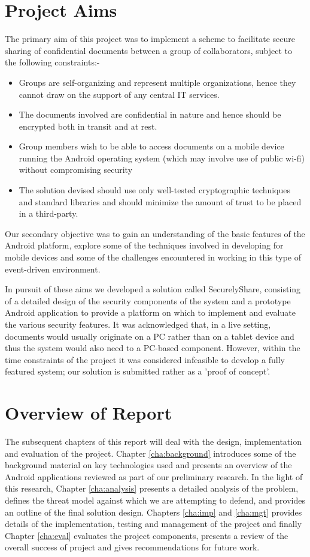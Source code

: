 \section{Project Aims}
\label{sec:aims}
The primary aim of this project was to implement a scheme to facilitate secure sharing of confidential documents between a group of collaborators, subject to the following constraints:-
\begin{itemize}
\item Groups are self-organizing and represent multiple organizations, hence they cannot draw on the support of any central IT services.
\item The documents involved are confidential in nature and hence should be encrypted both in transit and at rest.
\item Group members wish to be able to access documents on a mobile device running the Android operating system (which may involve use of public wi-fi) without compromising security 
\item The solution devised should use only well-tested cryptographic techniques and standard libraries and should minimize the amount of trust to be placed in a third-party.
\end{itemize}

Our secondary objective was to gain an understanding of the basic features of the Android platform, explore some of the techniques involved in developing  for mobile devices and some of the challenges encountered in working in this type of event-driven environment.

In pursuit of these aims we developed a solution called SecurelyShare, consisting of a detailed design of the security components of the system and a prototype Android application to provide a platform on which to implement and evaluate the various security features.  It was acknowledged that, in a live setting, documents would usually originate on a PC rather than on a tablet device and thus the system would also need to a PC-based component.  However, within the time constraints of the project it was considered infeasible to develop a fully featured system; our solution is submitted rather as a 'proof of concept'.

\section{Overview of Report}
\label{sec:overview}

The subsequent chapters of this report will deal with the design, implementation and evaluation of the project.  Chapter \ref{cha:background} introduces some of the background material on key technologies used and presents an overview of the Android applications reviewed as part of our preliminary research.  In the light of this research, Chapter \ref{cha:analysis} presents a detailed analysis of the problem, defines the threat model against which we are attempting to defend, and provides an outline of the final solution design. Chapters \ref{cha:imp} and \ref{cha:mgt} provides details of the implementation, testing and management of the project and finally Chapter  \ref{cha:eval} evaluates the project components, presents a review of the overall success of project and gives recommendations for future work.
